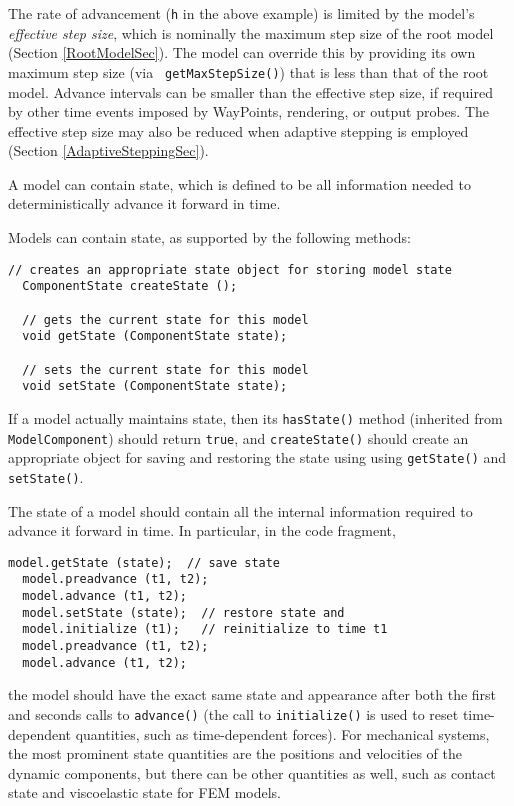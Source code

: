 \documentclass{article}
\begin{document}
The rate of advancement ({\tt h} in the above example) is limited by
the model's {\it effective step size}, which is nominally the maximum
step size of the root model (Section \ref{RootModelSec}). The model
can override this by providing its own maximum step size (via {\tt
getMaxStepSize()}) that is less than that of the root model.  Advance
intervals can be smaller than the effective step size, if required by
other time events imposed by WayPoints, rendering, or output
probes. The effective step size may also be reduced when adaptive
stepping is employed (Section \ref{AdaptiveSteppingSec}).

A model can contain state, which is defined to be all information
needed to deterministically advance it forward in time.

Models can contain state, as supported by the following methods:

\begin{lstlisting}[]
  // creates an appropriate state object for storing model state
  ComponentState createState ();

  // gets the current state for this model
  void getState (ComponentState state);

  // sets the current state for this model
  void setState (ComponentState state);
\end{lstlisting}

If a model actually maintains state, then its {\tt hasState()} method
(inherited from {\tt ModelComponent}) should return {\tt true}, and
{\tt createState()} should create an appropriate object for saving and
restoring the state using using {\tt getState()} and {\tt setState()}.

The state of a model should contain all the internal information
required to advance it forward in time. In particular, in the code
fragment,

\begin{lstlisting}[]
  model.getState (state);  // save state
  model.preadvance (t1, t2);
  model.advance (t1, t2);
  model.setState (state);  // restore state and
  model.initialize (t1);   // reinitialize to time t1
  model.preadvance (t1, t2);
  model.advance (t1, t2);
\end{lstlisting}

the model should have the exact same state and appearance after both
the first and seconds calls to {\tt advance()} (the call to {\tt initialize()} is
used to reset time-dependent quantities, such as time-dependent
forces). For mechanical systems, the most prominent state quantities
are the positions and velocities of the dynamic components, but there
can be other quantities as well, such as contact state and
viscoelastic state for FEM models.
  
\end{document}
